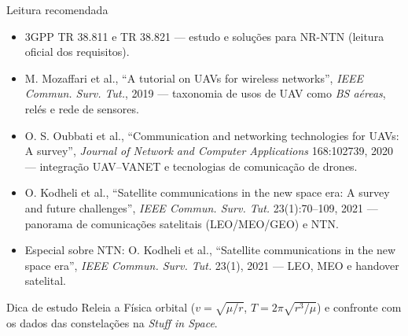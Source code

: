 \documentclass[aspectratio=169,11pt]{beamer}
\begin{document}
\begin{frame}{Leitura recomendada}
  \begin{itemize}
    \item 3GPP TR 38.811 e TR 38.821 --- estudo e soluções para NR-NTN (leitura oficial dos requisitos).
    \item M. Mozaffari et al., ``A tutorial on UAVs for wireless networks'', \emph{IEEE Commun. Surv. Tut.}, 2019 --- taxonomia de usos de UAV como \emph{BS aéreas}, relés e rede de sensores.
    \item O. S. Oubbati et al., ``Communication and networking technologies for UAVs: A survey'', \emph{Journal of Network and Computer Applications} 168:102739, 2020 --- integração UAV--VANET e tecnologias de comunicação de drones.
    \item O. Kodheli et al., ``Satellite communications in the new space era: A survey and future challenges'', \emph{IEEE Commun. Surv. Tut.} 23(1):70--109, 2021 --- panorama de comunicações satelitais (LEO/MEO/GEO) e NTN.
    \item Especial sobre NTN: O. Kodheli et al., ``Satellite communications in the new space era'', \emph{IEEE Commun. Surv. Tut.} 23(1), 2021 --- LEO, MEO e handover satelital.
  \end{itemize}
  \begin{alertblock}{Dica de estudo}
    Releia a Física orbital ($v = \sqrt{\mu/r}$, $T = 2\pi\sqrt{r^3/\mu}$) e confronte com os dados das constelações na \emph{Stuff in Space}.
  \end{alertblock}
\end{frame}
\end{document}
